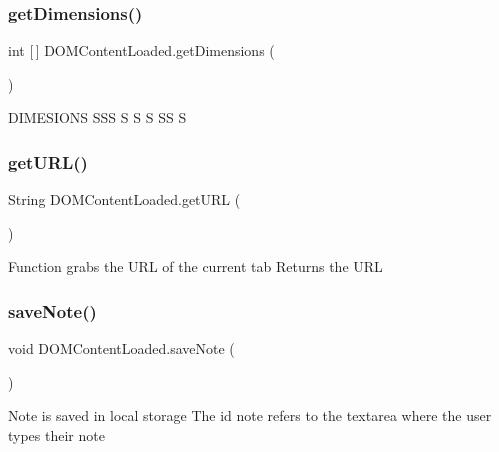 \subsubsection{\texorpdfstring{get\+Dimensions()}{getDimensions()}}
{\footnotesize\ttfamily int \mbox{[}$\,$\mbox{]} D\+O\+M\+Content\+Loaded.\+get\+Dimensions (\begin{DoxyParamCaption}{ }\end{DoxyParamCaption})\hspace{0.3cm}{\ttfamily [inline]}}

D\+I\+M\+E\+S\+I\+O\+NS S\+SS S S S SS S \mbox{\label{class_d_o_m_content_loaded_a03e60e64122c80b6dd06c48cc727345a}} 
\subsubsection{\texorpdfstring{get\+U\+R\+L()}{getURL()}}
{\footnotesize\ttfamily String D\+O\+M\+Content\+Loaded.\+get\+U\+RL (\begin{DoxyParamCaption}{ }\end{DoxyParamCaption})\hspace{0.3cm}{\ttfamily [inline]}}

Function grabs the U\+RL of the current tab Returns the U\+RL \mbox{\label{class_d_o_m_content_loaded_a9680fdf9c56b8536fa5788873cb7e020}} 
\subsubsection{\texorpdfstring{save\+Note()}{saveNote()}}
{\footnotesize\ttfamily void D\+O\+M\+Content\+Loaded.\+save\+Note (\begin{DoxyParamCaption}{ }\end{DoxyParamCaption})\hspace{0.3cm}{\ttfamily [inline]}}

Note is saved in local storage The id \textquotesingle{}note\textquotesingle{} refers to the textarea where the user types their note \mbox{\label{class_d_o_m_content_loaded_af7fd8c7ac1052d50a2d2b3186fa69017}} 
